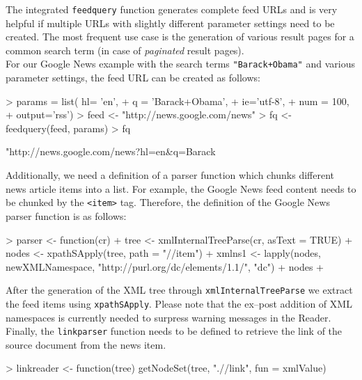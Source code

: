 \documentclass[a4paper]{article}
\let\code=\texttt
\newcommand{\class}[1]{\mbox{\textsf{#1}}}
\newcommand{\proglang}[1]{\textsf{#1}}
\newcommand{\fkt}[1]{\code{#1}}
\begin{document}
The integrated \fkt{feedquery} function generates complete feed  URLs and is very helpful if multiple
URLs with slightly different parameter settings need to be created. The most frequent use 
case is the generation of various result pages for a common search term (in case of \textit{paginated} result pages).\\
For our Google News example with the search terms \code{"Barack+Obama"} and various parameter settings,
the feed URL can be created as follows:
\begin{Schunk}
\begin{Sinput}
> params = list(	hl= 'en', 
+ 				q = 'Barack+Obama', 
+ 				ie='utf-8', 
+ 				num = 100, 
+ 				output='rss')
> feed <- "http://news.google.com/news"
> fq <- feedquery(feed, params)
> fq
\end{Sinput}
\begin{Soutput}
[1] "http://news.google.com/news?hl=en&q=Barack%
\end{Soutput}
\end{Schunk}
Additionally, we need a definition of a parser function which chunks different news article items into
a \class{list}. For example, the Google News feed content needs to be chunked by the \code{<item>} tag.
Therefore, the definition of the Google News parser function is as follows:
\begin{Schunk}
\begin{Sinput}
> parser <- function(cr){
+ 		tree <- xmlInternalTreeParse(cr, asText = TRUE)
+ 		nodes <- xpathSApply(tree, path = "//item")
+ 		xmlns1 <- lapply(nodes, newXMLNamespace, "http://purl.org/dc/elements/1.1/", "dc")
+ 		nodes
+ 	}
\end{Sinput}
\end{Schunk}
After the generation of the \proglang{XML} tree through \fkt{xmlInternalTreeParse} we extract the feed
items using \fkt{xpathSApply}. Please note that the ex--post addition of \proglang{XML} 
namespaces is currently needed to surpress warning messages in the \class{Reader}.\\
Finally, the \code{linkparser} function needs to be defined to retrieve the link of the source document from the 
news item.

\begin{Schunk}
\begin{Sinput}
> linkreader <- function(tree) getNodeSet(tree, ".//link", fun = xmlValue)
\end{Sinput}
\end{Schunk}
\end{document}

